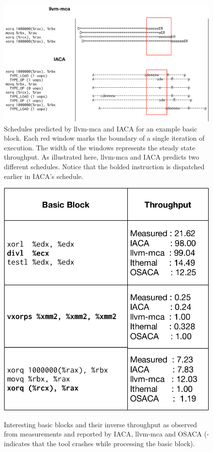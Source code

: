\begin{figure}[htbp!]
    \includegraphics[width=0.95\columnwidth]{figures/scheduling.pdf}
    \caption{Schedules predicted by llvm-mca and IACA for an example basic block.
    Each red window marks the boundary of a single iteration of execution.
    The width of the windows represents the steady state throughput.
    As illustrated here, llvm-mca and IACA predicts two different schedules.
    Notice that the bolded instruction is dispatched earlier in IACA's schedule.
    }
    \label{tab:case-study}
\end{figure}

\begin{figure}[htbp!]
    \begin{center}
    \includegraphics[width=0.7\columnwidth]{figures/interesting-examples.pdf}
    \caption{Interesting basic blocks and their inverse throughput as observed from measurements and reported by IACA, llvm-mca and OSACA (- indicates that the tool crashes while processing the basic block).}
    \label{tab:case-study}
    \label{fig:schedule}
    \end{center}
\end{figure}

